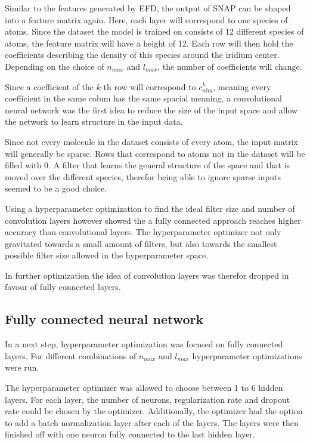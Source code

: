 Similar to the features generated by EFD, the output of SNAP can be shaped into a feature matrix again.
Here, each layer will correspond to one species of atoms.
Since the dataset the model is trained on consists of 12 different species of atoms, the feature matrix will have a height of 12.
Each row will then hold the coefficients describing the density of this species around the iridium center.
Depending on the choice of $n_{max}$ and $l_{max}$, the number of coefficients will change.

Since a coefficient of the $k$-th row will correspond to $c^k_{nlm}$, meaning every coefficient in the same colum has the same spacial meaning,
a convolutional neural network was the first idea to reduce the size of the input space and allow the network to learn structure in the input data.

Since not every molecule in the dataset consists of every atom, the input matrix will generally be sparse.
Rows that correspond to atoms not in the dataset will be filled with 0.
A filter that learns the general structure of the space and that is moved over the different species, therefor 
being able to ignore sparse inputs seemed to be a good choice.

Using a hyperparameter optimization to find the ideal filter size and number of convolution layers however showed
the a fully connected approach reaches higher accuracy than convolutional layers.
The hyperparameter optimizer not only gravitated towards a small amount of filters, but also towards 
the smallest possible filter size allowed in the hyperparameter space.

In further optimization the idea of convolution layers was therefor dropped in favour of fully connected layers.

\subsection{Fully connected neural network}

In a next step, hyperparameter optimization was focused on fully connected layers.
For different combinations of $n_{max}$ and $l_{max}$ hyperparameter optimizations were run.

The hyperparameter optimizer was allowed to choose between 1 to 6 hidden layers.
For each layer, the number of neurons, regularization rate and dropout rate could be chosen by the optimizer.
Additionally, the optimizer had the option to add a batch normalization layer after each of the layers.
The layers were then finished off with one neuron fully connected to the last hidden layer.

